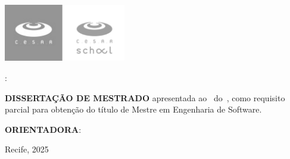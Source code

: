 \begin{titlepage}
    \begin{center}
      \includegraphics[height=2.5cm]{imagens/capa/logos-cesar-pb.png}
    
      \vspace*{1cm}
      {\large\MakeUppercase{\theauthor}}
    
      \vspace*{5cm}
      {\large\textbf{\MakeUppercase{\titulo}}:~\MakeUppercase{\subtitulo}}
    
      \hspace{0.45\textwidth}
      \begin{minipage}{0.5\textwidth}
        \onehalfspacing
        \textbf{\MakeUppercase{Dissertação de Mestrado}} apresentada ao \programa~do~\cesar, como requisito parcial para obtenção do título de Mestre em Engenharia de Software.
        
        \vspace*{0.7em}
        \textbf{\MakeUppercase{Orientadora}}: \MakeUppercase{\orientadora}
      \end{minipage}
    
      {\small Recife, 2025}
    \end{center}
\end{titlepage}
